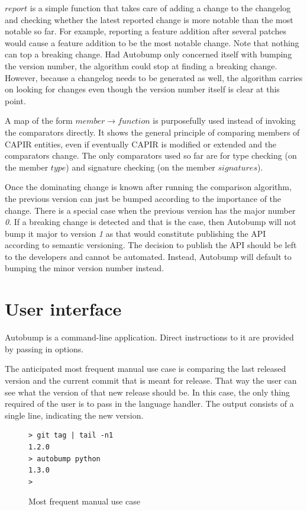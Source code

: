 \documentclass{l4proj}
\begin{document}
$report$ is a simple function that takes care of adding a change to
the changelog and checking whether the latest reported change is more
notable than the most notable so far. For example, reporting a feature
addition after several patches would cause a feature addition to be
the most notable change. Note that nothing can top a breaking change.
Had Autobump only concerned itself with bumping the version number,
the algorithm could stop at finding a breaking change. However,
because a changelog needs to be generated as well, the algorithm
carries on looking for changes even though the version number itself
is clear at this point.

A map of the form $member \rightarrow function$ is purposefully used
instead of invoking the comparators directly. It shows the general
principle of comparing members of CAPIR entities, even if eventually
CAPIR is modified or extended and the comparators change. The only
comparators used so far are for type checking (on the member $type$)
and signature checking (on the member $signatures$).

Once the dominating change is known after running the comparison
algorithm, the previous version can just be bumped according to the
importance of the change. There is a special case when the previous
version has the major number \textit{0}. If a breaking change is
detected and that is the case, then Autobump will not bump it major to
version \textit{1} as that would constitute publishing the API
according to semantic versioning. The decision to publish the API
should be left to the developers and cannot be automated. Instead,
Autobump will default to bumping the minor version number instead.

\section{User interface}

Autobump is a command-line application. Direct instructions to it are
provided by passing in options.

The anticipated most frequent manual use case is comparing the last
released version and the current commit that is meant for release.
That way the user can see what the version of that new release should
be. In this case, the only thing required of the user is to pass in
the language handler. The output consists of a single line, indicating
the new version.

\begin{figure}[H]
\centering
\caption{Most frequent manual use case}
\begin{BVerbatim}
> git tag | tail -n1
1.2.0
> autobump python
1.3.0
>
\end{BVerbatim}
\end{figure}
\end{document}
